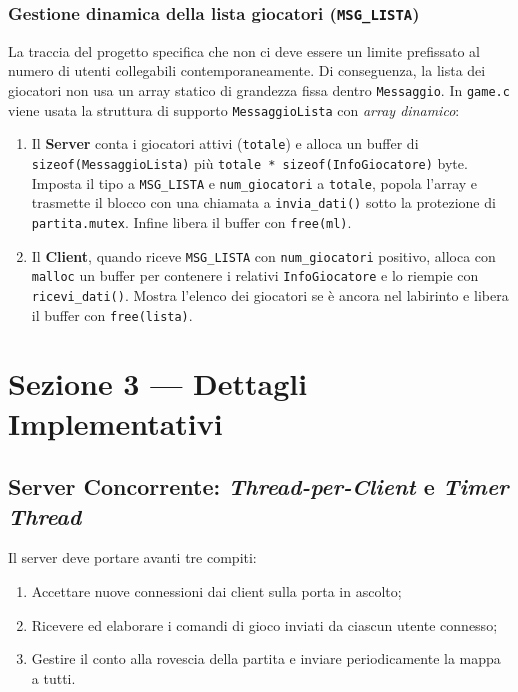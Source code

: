 \documentclass[11pt,a4paper]{article}
\begin{document}
\subsubsection{Gestione dinamica della lista giocatori (\texttt{MSG\_LISTA})}
La traccia del progetto specifica che non ci deve essere un limite prefissato al numero di utenti collegabili contemporaneamente. Di conseguenza, la lista dei giocatori non usa un array statico di grandezza fissa dentro \texttt{Messaggio}. In \texttt{game.c} viene usata la struttura di supporto \texttt{MessaggioLista} con \textit{array dinamico}:
\begin{enumerate}
    \item Il \textbf{Server} conta i giocatori attivi (\texttt{totale}) e alloca un buffer di \texttt{sizeof(MessaggioLista)} più \texttt{totale * sizeof(InfoGiocatore)} byte. Imposta il tipo a \texttt{MSG\_LISTA} e \texttt{num\_giocatori} a \texttt{totale}, popola l'array e trasmette il blocco con una chiamata a \texttt{invia\_dati()} sotto la protezione di \texttt{partita.mutex}. Infine libera il buffer con \texttt{free(ml)}.
    \item Il \textbf{Client}, quando riceve \texttt{MSG\_LISTA} con \texttt{num\_giocatori} positivo, alloca con \texttt{malloc} un buffer per contenere i relativi \texttt{InfoGiocatore} e lo riempie con \texttt{ricevi\_dati()}. Mostra l'elenco dei giocatori se è ancora nel labirinto e libera il buffer con \texttt{free(lista)}.
\end{enumerate}

\clearpage

\section{Sezione 3 --- Dettagli Implementativi}

\subsection{Server Concorrente: \textit{Thread-per-Client} e \textit{Timer Thread}}

Il server deve portare avanti tre compiti:
\begin{enumerate}
    \item Accettare nuove connessioni dai client sulla porta in ascolto;
    \item Ricevere ed elaborare i comandi di gioco inviati da ciascun utente connesso;
    \item Gestire il conto alla rovescia della partita e inviare periodicamente la mappa a tutti.
\end{enumerate}
\end{document}
